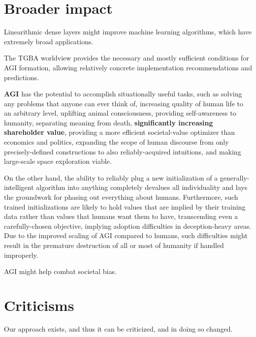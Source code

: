 \documentclass{article}
\begin{document}
\section{Broader impact}

Linearithmic dense layers might improve machine learning algorithms, which have extremely broad applications.

The TGBA worldview provides the necessary and mostly sufficient conditions for AGI formation, allowing relatively concrete implementation recommendations and predictions.

\textbf{AGI} has the potential to accomplish situationally useful tasks, such as solving any problems that anyone can ever think of, increasing quality of human life to an arbitrary level, uplifting animal consciousness, providing self-awareness to humanity, separating meaning from death, \textbf{significantly increasing shareholder value}, providing a more efficient societal-value optimizer than economics and politics, expanding the scope of human discourse from only precisely-defined constructions to also reliably-acquired intuitions, and making large-scale space exploration viable.

On the other hand, the ability to reliably plug a new initialization of a generally-intelligent algorithm into anything completely devalues all individuality and lays the groundwork for phasing out everything about humans. Furthermore, such trained initializations are likely to hold values that are implied by their training data rather than values that humans want them to have, transcending even a carefully-chosen objective, implying adoption difficulties in deception-heavy areas. Due to the improved scaling of AGI compared to humans, such difficulties might result in the premature destruction of all or most of humanity if handled improperly.

AGI might help combat societal bias.

\section{Criticisms}

Our approach exists, and thus it can be criticized, and in doing so changed.
\end{document}
